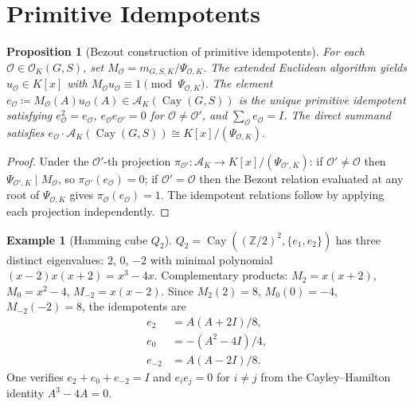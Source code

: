 \documentclass[12pt]{amsart}
\numberwithin{equation}{section}
\theoremstyle{plain}
\newtheorem{proposition}[theorem]{Proposition}
\theoremstyle{definition}
\newtheorem{example}[theorem]{Example}
\DeclareMathOperator{\Cay}{Cay}
\newcommand{\Z}{\mathbb{Z}}
\newcommand{\calA}{\mathcal{A}}
\newcommand{\calO}{\mathcal{O}}
\begin{document}
\section{Primitive Idempotents}
\label{sec:idem}

\begin{proposition}[Bezout construction of primitive idempotents]
\label{prop:idem}
For each $\calO \in \calO_K(G,S)$, set $M_\calO = m_{G,S,K}/\Psi_{\calO,K}$.
The extended Euclidean algorithm yields $u_\calO \in K[x]$ with
$M_\calO u_\calO \equiv 1 \pmod{\Psi_{\calO,K}}$.  The element
$e_\calO \coloneqq M_\calO(A) u_\calO(A) \in \calA_K(\Cay(G,S))$
is the unique primitive idempotent satisfying
$e_\calO^2 = e_\calO$, $e_\calO e_{\calO'} = 0$ for $\calO \ne \calO'$,
and $\sum_\calO e_\calO = I$.
The direct summand satisfies $e_\calO \cdot \calA_K(\Cay(G,S)) \cong K[x]/(\Psi_{\calO,K})$.
\end{proposition}

\begin{proof}
Under the $\calO'$-th projection $\pi_{\calO'} : \calA_K \to
K[x]/(\Psi_{\calO',K})$: if $\calO' \ne \calO$ then $\Psi_{\calO',K} \mid
M_\calO$, so $\pi_{\calO'}(e_\calO) = 0$; if $\calO' = \calO$ then the
Bezout relation evaluated at any root of $\Psi_{\calO,K}$ gives
$\pi_\calO(e_\calO) = 1$.  The idempotent relations follow by applying each
projection independently.
\end{proof}

\begin{example}[Hamming cube $Q_2$]
\label{ex:Q2-idem}
$Q_2 = \Cay((\Z/2)^2, \{e_1, e_2\})$ has three distinct eigenvalues:
$2$, $0$, $-2$ with minimal polynomial $(x-2)x(x+2) = x^3 - 4x$.
Complementary products: $M_2 = x(x+2)$, $M_0 = x^2-4$, $M_{-2} = x(x-2)$.
Since $M_2(2) = 8$, $M_0(0) = -4$, $M_{-2}(-2) = 8$, the idempotents are
\begin{align*}
  e_2    &= A(A+2I)/8, \\
  e_0    &= -(A^2-4I)/4, \\
  e_{-2} &= A(A-2I)/8.
\end{align*}
One verifies $e_2 + e_0 + e_{-2} = I$ and $e_i e_j = 0$ for $i \ne j$
from the Cayley--Hamilton identity $A^3 - 4A = 0$.
\end{example}
\end{document}
